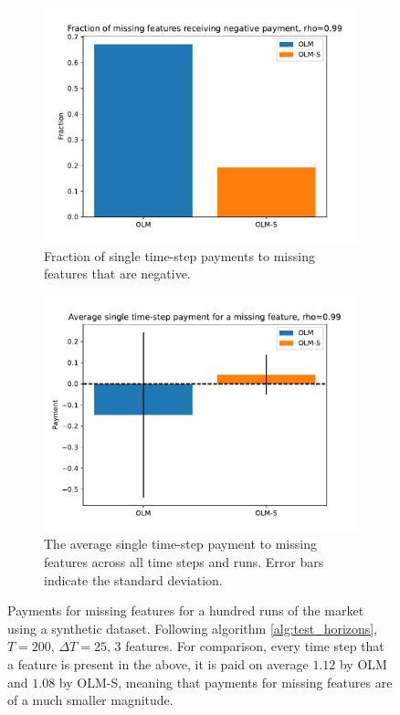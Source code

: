 \begin{figure}
  \centering
  \begin{subfigure}{.4\textwidth}
    \centering
    \includegraphics[width=.9\linewidth]{Pictures/missing_negative_fraction.pdf}
    \caption{Fraction of single time-step payments to missing features that are negative.}
    \label{fig:missing_negative_fraction}
  \end{subfigure}%
  \hspace{1em}
  \begin{subfigure}{.4\textwidth}
    \centering
    \includegraphics[width=.9\linewidth]{Pictures/missing_payment.pdf}
    \caption{The average single time-step payment to missing features across
      all time steps and runs. Error bars indicate the standard deviation.}
    \label{fig:missing_payment}
  \end{subfigure}%
  \caption{Payments for missing features for a hundred runs of the market using a synthetic dataset. Following algorithm \ref{alg:test_horizons}, $T=200$, $\Delta T=25$, 3 features. For comparison, every time step that a feature is present in the above, it is paid on average $1.12$ by OLM and $1.08$ by OLM-S, meaning that payments for missing features are of a much smaller magnitude.}
  \label{fig:missing_features}
\end{figure}

